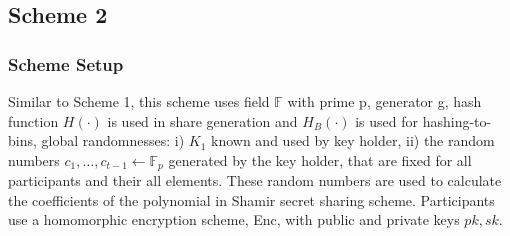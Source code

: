 \subsection{Scheme 2}
\subsubsection{Scheme Setup}
Similar to Scheme 1, this scheme uses field $\mathbb{F}$ with prime p, generator g, hash function $H(\cdot)$ is used in share generation and $H_B(\cdot)$ is used for hashing-to-bins, global randomnesses: i) $K_1$ known and used by key holder, ii) the random numbers $c_1, \dots, c_{t-1} \gets \mathbb{F}_p$ generated by the key holder, that are fixed for all participants and their all elements. These random numbers are used to calculate the coefficients of the polynomial in Shamir secret sharing scheme. Participants use a homomorphic encryption scheme, Enc, with public and private keys $pk, sk$.
